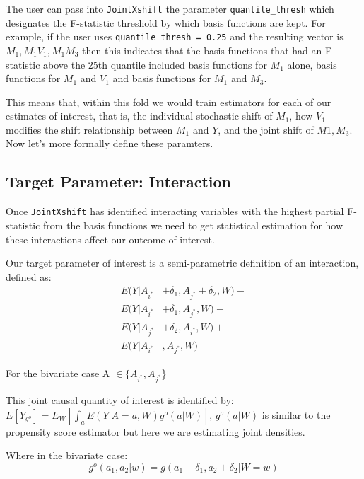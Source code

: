 \documentclass[
]{article}
\begin{document}
The user can pass into \texttt{JointXshift} the parameter
\texttt{quantile\_thresh} which designates the F-statistic threshold by
which basis functions are kept. For example, if the user uses
\texttt{quantile\_thresh\ =\ 0.25} and the resulting vector is
\(M_1, M_1V_1, M_1M_3\) then this indicates that the basis functions
that had an F-statistic above the 25th quantile included basis functions
for \(M_1\) alone, basis functions for \(M_1\) and \(V_1\) and basis
functions for \(M_1\) and \(M_3\).

This means that, within this fold we would train estimators for each of
our estimates of interest, that is, the individual stochastic shift of
\(M_1\), how \(V_1\) modifies the shift relationship between \(M_1\) and
\(Y\), and the joint shift of \(M1,M_3\). Now let's more formally define
these paramters.

\hypertarget{target-parameter-interaction}{%
\subsection{Target Parameter:
Interaction}\label{target-parameter-interaction}}

Once \texttt{JointXshift} has identified interacting variables with the
highest partial F-statistic from the basis functions we need to get
statistical estimation for how these interactions affect our outcome of
interest.

Our target parameter of interest is a semi-parametric definition of an
interaction, defined as: \begin{equation} \label{eq1}
\begin{split}
E(Y|A_{i^*} &+ \delta_1, A_{j^*} + \delta_2, W) - \\ 
E(Y|A_{i^*} &+ \delta_1, A_{j^*}, W) - \\ 
E(Y|A_{j^*} &+ \delta_2,  A_{i^*}, W) + \\
E(Y|A_{i^*}&, A_{j^*}, W) 
\end{split}
\end{equation}

For the bivariate case A \(\in \{A_{i^*}, A_{j^*}\)\}

This joint causal quantity of interest is identified by:
\(E[Y_{g^o}] = E_W [\int_a E(Y|A=a, W)g^o(a|W)]\), \(g^o(a|W)\) is
similar to the propensity score estimator but here we are estimating
joint densities.

Where in the bivariate case:
\[g^o(a_1, a_2|w) = g(a_1 + \delta_1, a_2 + \delta_2|W = w)\]
\end{document}
